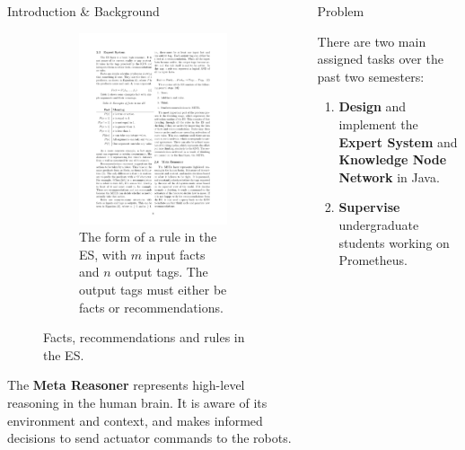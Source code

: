 \documentclass[final]{beamer} %
\newlength{\columnheight}
\begin{document}
\begin{frame}
\begin{columns}
\begin{column}{.33\textwidth}
{\begin{block}{Introduction \& Background}
{\begin{figure}[!htb]
\begin{subfigure}[!htb]{0.58\columnwidth}
							\includegraphics[width=\columnwidth]{figures/rule.pdf}
							\caption{The form of a rule in the ES, with $m$ input facts and $n$ output tags. The output tags must either be facts or recommendations.}
						\end{subfigure}
						\caption{Facts, recommendations and rules in the ES.}
					\end{figure}
					
					
					The \textbf{Meta Reasoner} represents high-level reasoning in the human brain. It is aware of its environment and context, and makes informed decisions to send actuator commands to the robots.}
				\end{block}
			}
			\end{column}
			\begin{column}{.33\textwidth}
				\parbox[t][\columnheight]{\textwidth}{
				
				\begin{block}{Problem}
					\parbox{0.99\textwidth}{
					There are two main assigned tasks over the past two semesters:
					\begin{enumerate}
						\item \textbf{Design} and implement the \textbf{Expert System} and \textbf{Knowledge Node Network} in Java.
						\item \textbf{Supervise} undergraduate students working on Prometheus.
				\end{enumerate}}
				\end{block}
					
}
\end{column}
\end{columns}
\end{frame}
\end{document}
